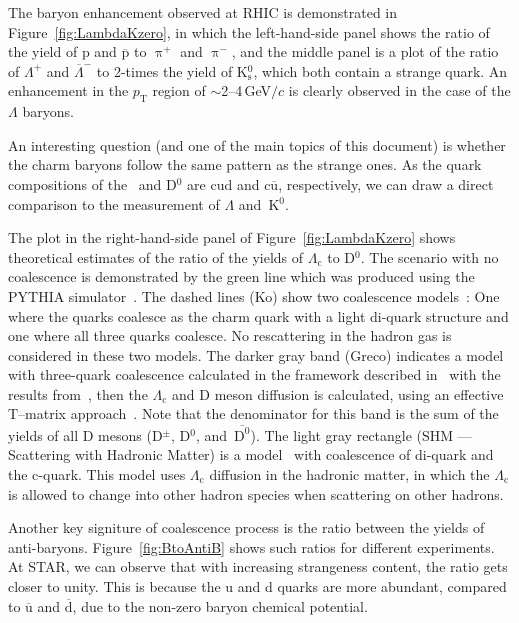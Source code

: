 The baryon enhancement observed at RHIC is demonstrated in Figure~\ref{fig:LambdaKzero}, in which the left-hand-side panel shows the ratio of the yield of p and $\overline{\mathrm{p}}$ to $\uppi^+$ and $\uppi^-$, and the middle panel is a plot of the ratio of $\Lambda^+$ and $\overline{\Lambda}^-$ to 2-times the yield of K$^0_\mathrm{s}$, which both contain a strange quark. An enhancement in the $p_\mathrm{T}$ region of $\sim$2--4$\,$GeV$/c$ is clearly observed in the case of the $\Lambda$ baryons. 

An interesting question (and one of the main topics of this document) is whether the charm baryons follow the same pattern as the strange ones. As the quark compositions of the \Lambdac\ and D$^0$ are cud and c$\overline{\mathrm{u}}$, respectively, we can draw a direct comparison to the measurement of $\Lambda$ and~K$^0$.

The plot in the right-hand-side panel of Figure~\ref{fig:LambdaKzero} shows theoretical estimates of the ratio of the yields of $\Lambda_\mathrm{c}$ to D$^0$. The scenario with no coalescence is demonstrated by the green line which was produced using the PYTHIA simulator~\cite{PYTHIA}. The dashed lines (Ko) show two coalescence models~\cite{LcCoalescence_OhKoLeeYasui}: One where the  quarks coalesce as the charm quark with a light di-quark structure and one where all three quarks coalesce. No rescattering in the hadron gas is considered in these two models. The darker gray band (Greco) indicates a model with three-quark coalescence calculated in the framework described in~\cite{Greco_framework} with the results from~\cite{Greco_results}, then the $\Lambda_\mathrm{c}$ and D meson diffusion is calculated, using an effective T--matrix approach~\cite{Ghosh_Lc_rescattering}. Note that the denominator for this band is the sum of the yields of all D mesons (D$^\pm$, D$^0$, and~$\mathrm{\overline{D^0}}$). The light gray rectangle (SHM --- Scattering with Hadronic Matter) is a model~\cite{SHM} with coalescence of di-quark and the c-quark. This model uses $\Lambda_\mathrm{c}$ diffusion in the hadronic matter, in which the $\Lambda_\mathrm{c}$ is allowed to change into other hadron species when scattering on other hadrons.

Another key signiture of coalescence process is the ratio between the yields of anti-baryons. Figure~\ref{fig:BtoAntiB} shows such ratios for different experiments. At STAR, we can observe that with increasing strangeness content, the ratio gets closer to unity. This is because the u and d quarks are more abundant, compared to $\overline{\mathrm{u}}$ and $\overline{\mathrm{d}}$, due to the non-zero baryon chemical potential. 

